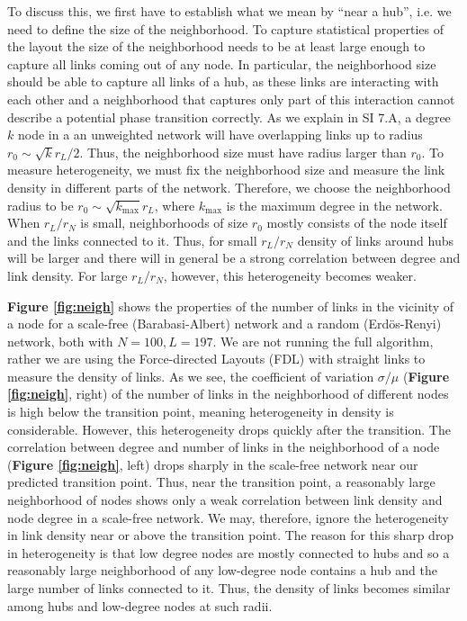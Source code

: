 \documentclass[11pt]{article}
\begin{document}
To discuss this, we first have to establish what we mean by ``near a hub'', i.e. we need to define the size of the neighborhood.
To capture statistical properties of the layout the size of the neighborhood needs to be at least large enough to capture all links coming out of any node. 
In particular, the neighborhood size should be able to capture all links of a hub, as these links are interacting with each other and a neighborhood that captures only part of this interaction cannot describe a potential phase transition correctly. 
As we explain in SI 7.A, a degree $k$ node in a an unweighted network will have overlapping links up to radius $r_0\sim \sqrt{k} r_L/2 $. 
Thus, the neighborhood size must have radius larger than $r_0$. 
To measure heterogeneity, we must fix the neighborhood size and measure the link density in different parts of the network. 
Therefore, we choose the neighborhood radius to be $r_0\sim \sqrt{k_{\max}} r_L  $, where $k_{\max}$ is the maximum degree in the network. 
When $r_L/r_N$ is small, neighborhoods of size $r_0$ mostly consists of the node itself and the links connected to it. 
Thus, for small $r_L/r_N$ density of links around hubs will be larger and there will in general be a strong correlation between degree and link density. 
For large $r_L/r_N$, however, this heterogeneity becomes weaker. 

\textbf{Figure \ref{fig:neigh}} shows the properties of the number of links in the vicinity of a node for a scale-free (Barabasi-Albert) network and a random (Erd\"os-Renyi) network, both with $N=100, L=197$. 
We are not running the full algorithm, rather we are using the Force-directed Layouts (FDL) with straight links to measure the density of links. 
As we see, the coefficient of variation $\sigma/\mu$ (\textbf{Figure \ref{fig:neigh}}, right) of the number of links in the neighborhood of different nodes is high below the transition point, meaning heterogeneity in density is considerable. 
However, this heterogeneity  drops quickly after the transition.  
The correlation between degree and number of links in the neighborhood of a node (\textbf{Figure \ref{fig:neigh}}, left) drops sharply in the scale-free  network near our predicted transition point. 
Thus, near the transition point, a reasonably large neighborhood of nodes shows only a weak correlation between link density and node degree in a scale-free network.
We may, therefore, ignore the heterogeneity in link density near or above the transition point. 
The reason for this sharp drop in heterogeneity is that low degree nodes are mostly connected to hubs and so a reasonably large neighborhood of any low-degree node contains a hub and the large number of links connected to it. Thus, the density of links becomes similar among hubs and low-degree nodes at such radii.  
\end{document}
